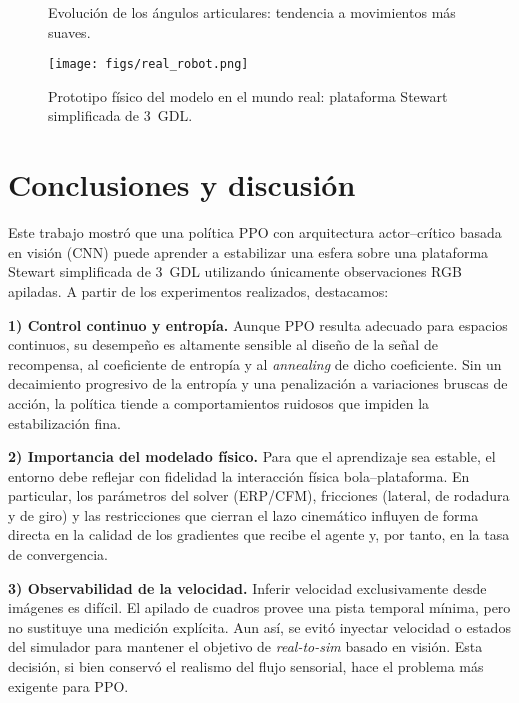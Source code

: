 \documentclass[conference]{IEEEtran}
\begin{document}
\begin{figure}[th]
  \centering
  \caption{Evolución de los ángulos articulares: tendencia a movimientos más suaves.}
  \label{fig:joints}
\end{figure}

\begin{figure}[th]
  \centering
  \texttt{[image: figs/real\_robot.png]}
  \caption{Prototipo físico del modelo en el mundo real: plataforma Stewart simplificada de 3~GDL.}
  \label{fig:real-proto}
\end{figure}

\section{Conclusiones y discusión}
Este trabajo mostró que una política PPO con arquitectura actor--crítico basada en visión (CNN) puede aprender a estabilizar una esfera sobre una plataforma Stewart simplificada de 3~GDL utilizando únicamente observaciones RGB apiladas. A partir de los experimentos realizados, destacamos:

\textbf{1) Control continuo y entropía.}
Aunque PPO resulta adecuado para espacios continuos, su desempeño es altamente sensible al diseño de la señal de recompensa, al coeficiente de entropía y al \emph{annealing} de dicho coeficiente. Sin un decaimiento progresivo de la entropía y una penalización a variaciones bruscas de acción, la política tiende a comportamientos ruidosos que impiden la estabilización fina.

\textbf{2) Importancia del modelado físico.}
Para que el aprendizaje sea estable, el entorno debe reflejar con fidelidad la interacción física bola--plataforma. En particular, los parámetros del solver (ERP/CFM), fricciones (lateral, de rodadura y de giro) y las restricciones que cierran el lazo cinemático influyen de forma directa en la calidad de los gradientes que recibe el agente y, por tanto, en la tasa de convergencia.

\textbf{3) Observabilidad de la velocidad.}
Inferir velocidad exclusivamente desde imágenes es difícil. El apilado de cuadros provee una pista temporal mínima, pero no sustituye una medición explícita. Aun así, se evitó inyectar velocidad o estados del simulador para mantener el objetivo de \emph{real-to-sim} basado en visión. Esta decisión, si bien conservó el realismo del flujo sensorial, hace el problema más exigente para PPO.
\end{document}
